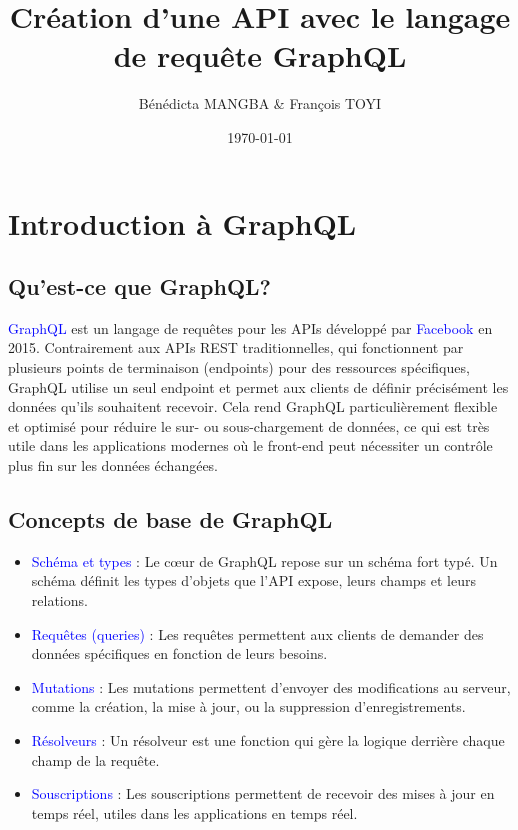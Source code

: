 \documentclass{article}
\title{Création d’une API avec le langage de requête
GraphQL }
\author{Bénédicta MANGBA \& François TOYI}
\date{\today}
\begin{document}
\maketitle

\tableofcontents
\newpage

\section{Introduction à GraphQL}
\subsection{Qu'est-ce que GraphQL?}
\textcolor{blue}{GraphQL} est un langage de requêtes pour les APIs développé par \textcolor{blue}{Facebook} en 2015. Contrairement aux APIs REST traditionnelles, qui fonctionnent par plusieurs points de terminaison (endpoints) pour des ressources spécifiques, GraphQL utilise un seul endpoint et permet aux clients de définir précisément les données qu'ils souhaitent recevoir. Cela rend GraphQL particulièrement flexible et optimisé pour réduire le sur- ou sous-chargement de données, ce qui est très utile dans les applications modernes où le front-end peut nécessiter un contrôle plus fin sur les données échangées.



\subsection{Concepts de base de GraphQL}
\begin{itemize}
    \item \textcolor{blue}{Schéma et types} : Le cœur de GraphQL repose sur un schéma fort typé. Un schéma définit les types d'objets que l'API expose, leurs champs et leurs relations.
    \item \textcolor{blue}{Requêtes (queries)} : Les requêtes permettent aux clients de demander des données spécifiques en fonction de leurs besoins.
    \item \textcolor{blue}{Mutations} : Les mutations permettent d'envoyer des modifications au serveur, comme la création, la mise à jour, ou la suppression d'enregistrements.
    \item \textcolor{blue}{Résolveurs} : Un résolveur est une fonction qui gère la logique derrière chaque champ de la requête.
    \item \textcolor{blue}{Souscriptions} : Les souscriptions permettent de recevoir des mises à jour en temps réel, utiles dans les applications en temps réel.
\end{itemize}
\end{document}
